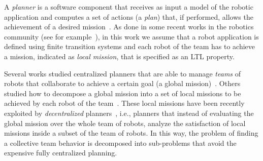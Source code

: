 
A \emph{planner} is  a software component that receives as input a model of the robotic application and computes  a set of actions (a \emph{plan}) that, if performed, allows the achievement of a desired mission~\cite{latombe2012robot}.
As done in some recent works in the robotics community (see for example~\cite{fainekos2005temporal,kress2007s,kloetzer2008fully,fainekos2009temporal,wongpiromsarn2010receding,bhatia2010sampling,bhatia2010motion}), in this work we assume that 
a robot application is defined using finite transition systems and
each robot of the team  has to achieve a mission,  indicated as \emph{local mission}, that is specified as an LTL property. 

Several works studied centralized planners that are able to manage \emph{teams} of robots that collaborate to achieve a certain goal (a global mission)~\cite{kloetzer2011multi,loizou2005automated,quottrup2004multi}.
Others studied how to decompose a global mission into a set of local missions to be achieved by each robot of the team~\cite{schillinger2016decomposition,guo2015multi,guo2015multi,tumova2016multi}. 
These local missions have been recently exploited by \emph{decentralized} planners~\cite{tumova2016multi}, i.e., planners that instead of evaluating the global mission over the whole team of robots, analyze the satisfaction of local missions inside a subset of the team of robots. 
In this way, the problem of finding a collective team behavior is decomposed into sub-problems that avoid the expensive fully centralized planning.


